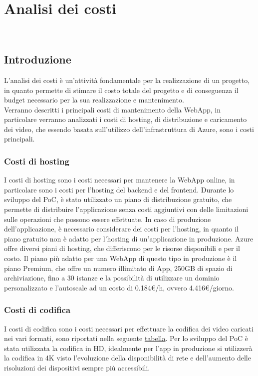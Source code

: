 \chapter{Analisi dei costi}
\label{cap:analisi-costi}
\\

\section{Introduzione}
\label{sec:introduzione}
L'analisi dei costi è un'attività fondamentale per la realizzazione di un progetto, in quanto permette di stimare il costo totale del progetto e di conseguenza il budget necessario per la sua realizzazione e mantenimento.\\
Verranno descritti i principali costi di mantenimento della WebApp, in particolare verranno analizzati i costi di hosting, di distribuzione e caricamento dei video, che essendo basata sull'utilizzo dell'infrastruttura di Azure, sono i costi principali.\\

\subsection{Costi di hosting}
\label{subsec:costi-hosting}
I costi di hosting sono i costi necessari per mantenere la WebApp online, in particolare sono i costi per l'hosting del backend e del frontend. Durante lo sviluppo del PoC, è stato utilizzato un piano di distribuzione gratuito, che permette di distribuire l'applicazione senza costi aggiuntivi con delle limitazioni sulle operazioni che possono essere effettuate. In caso di produzione dell'applicazione, è necessario considerare dei costi per l'hosting, in quanto il piano gratuito non è adatto per l'hosting di un'applicazione in produzione. Azure offre diversi piani di hosting, che differiscono per le risorse disponibili e per il costo. Il piano più adatto per una WebApp di questo tipo in produzione è il piano Premium, che offre un numero illimitato di App, 250GB di spazio di archiviazione, fino a 30 istanze e la possibilità di utilizzare un dominio personalizzato e l'autoscale ad un costo di 0.184€/h, ovvero 4.416€/giorno.\\
\subsection{Costi di codifica}
I costi di codifica sono i costi necessari per effettuare la codifica dei video caricati nei vari formati, sono riportati nella seguente \href{https://azure.microsoft.com/en-us/pricing/details/media-services/\#pricing}{tabella}.
Per lo sviluppo del PoC è stata utilizzata la codifica in HD, idealmente per l'app in produzione si utilizzerà la codifica in 4K visto l'evoluzione della disponibilità di rete e dell'aumento delle risoluzioni dei dispositivi sempre più accessibili.

